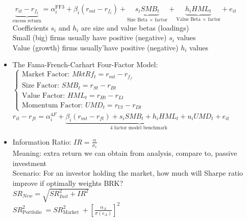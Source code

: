 \documentclass[10pt,landscape]{article}
\begin{document}
\begin{multicols}{2}
\begin{itemize}
            {\color{red}
            $\underbrace{r_{i t}-r_{f_{t}}}_{\text{excess return} }=
            \alpha_{i}^{\mathrm{FF} 3}+
            \beta_{i}\left(r_{m t}-r_{f_{t}}\right)+
            \underbrace{s_{i} S M B_{t}}_{\text{Size Beta $\times$ factor}}+
            \underbrace{h_{i} H M L_{t}}_{\text{Value Beta $\times$ factor}}+
            e_{i t}$}\\
            Coefficients $s_{i}$ and $h_{i}$ are size and value betas (loadings)\\
            Small (big) firms usually have positive (negative) $s_{i}$ values \\
            Value (growth) firms usually'have positive (negative) $h_{i}$ values

        \item {\color{blue}The Fama-French-Carhart Four-Factor Model}:
            $
            \begin{cases}
                \text{Market Factor: }M k t R f_{t}=r_{m t}-r_{f_{f}}\\
                \text{Size Factor: }S M B_{t}=r_{S t}-r_{B t}\\
                \text{Value Factor: }H M L_{t}=r_{H t}-r_{L t}\\
                \text{Momentum Factor: }U M D_{t}=r_{U t}-r_{D t} 
            \end{cases}
            $\\

            {\color{red}
            $r_{i t}-r_{f t}=\alpha_{i}^{4 F}+\underbrace{\beta_{i}\left(r_{m t}-r_{f t}\right)+s_{i} S M B_{t}+h_{i} H M L_{t}+u_{i} U M D_{t}}_{4 \text { factor model benchmark }}+e_{i t}$
            }

        \item Information Ratio: $\displaystyle I R=\frac{\alpha}{\sigma_{e}}$\\
            Meaning: extra return we can obtain from analysis, compare to, passive investment\\
            Scenario: For an investor holding the market, how much will Sharpe ratio improve if optimally weights BRK?\\
                $S R_{N e w}=\sqrt{SR_{Init}^{2}+IR^{2}}$\\
                $S R_{\text {Portfolio }}^{2}=S R_{\text {Market }}^{2}+\left[\displaystyle \frac{\alpha_{A}}{\sigma\left(e_{A}\right)}\right]^{2}$
    \end{itemize}


\end{multicols}
\end{document}

